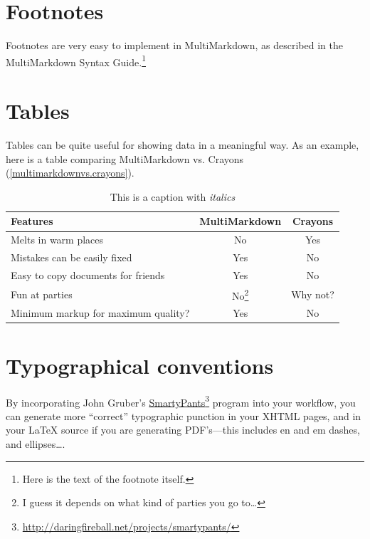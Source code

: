 \section{Footnotes}
\label{footnotes}

Footnotes are very easy to implement in MultiMarkdown, as described in the
MultiMarkdown Syntax Guide.\footnote{Here is the text of the footnote itself.}

\section{Tables}
\label{tables}

Tables can be quite useful for showing data in a meaningful way. As an
example, here is a table comparing MultiMarkdown vs. Crayons (\autoref{multimarkdownvs.crayons}).

\begin{table}[htbp]
\begin{minipage}{\linewidth}
\setlength{\tymax}{0.5\linewidth}
\centering
\small
\caption{This is a caption with \emph{italics}}
\label{multimarkdownvs.crayons}
\begin{tabular}{@{}lcc@{}} \toprule
Features&MultiMarkdown&Crayons\\
\midrule
Melts in warm places&No&Yes\\
Mistakes can be easily fixed&Yes&No\\
Easy to copy documents for friends&Yes&No\\
Fun at parties&No\footnote{I guess it depends on what kind of parties you go to{\ldots}}&Why not?\\

\midrule
Minimum markup for maximum quality?&Yes&No\\

\bottomrule

\end{tabular}
\end{minipage}
\end{table}


\section{Typographical conventions}
\label{typographicalconventions}

By incorporating John Gruber's \href{http://daringfireball.net/projects/smartypants/}{SmartyPants}\footnote{\href{http://daringfireball.net/projects/smartypants/}{http:/\slash daringfireball.net\slash projects\slash smartypants\slash }} program into your workflow, you
can generate more ``correct'' typographic punction in your XHTML pages, and in
your LaTeX source if you are generating PDF's---this includes en and em
dashes, and ellipses{\ldots}.

